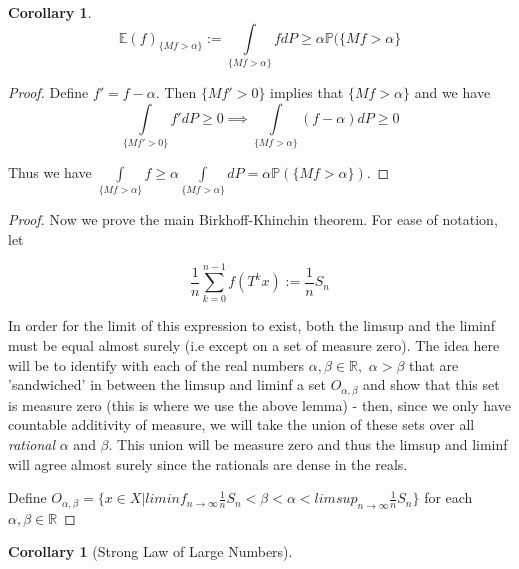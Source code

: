\documentclass[letterpaper,10pt,oneside,onecolumn,reqno]{amsart}
\newcommand{\E}{\mathbb E}
\renewcommand{\P}{\mathbb P}
\newcommand{\R}{\mathbb R}
\theoremstyle{definition}
\newtheorem{cor}[thm]{Corollary}
\begin{document}
\begin{cor}
$$\mbox{$\E(f)_{\{Mf>\alpha\}} := \int\limits_{\{Mf>\alpha\}} fdP \geq \alpha \P(\{Mf>\alpha\}$}$$
\end{cor}
\begin{proof}
Define $f' = f - \alpha$. Then $\{Mf' > 0\}$ implies that $\{Mf > \alpha\}$ and we have
$$\mbox{$\int\limits_{\{Mf'>0\}} f'dP \geq 0 \implies \int\limits_{\{Mf>\alpha\}} (f-\alpha)dP \geq 0$}$$

Thus we have $\int\limits_{\{Mf>\alpha\}} f \geq \alpha\int\limits_{\{Mf>\alpha\}}dP = \alpha\P(\{Mf>\alpha\})$.
\end{proof}




		\begin{proof}
Now we prove the main Birkhoff-Khinchin theorem. For ease of notation, let 

$$\mbox{$\frac{1}{n}\sum\limits_{k=0}^{n-1} f(T^kx) := \frac{1}{n}S_n$}$$

In order for the limit of this expression to exist, both the limsup and the liminf must be equal almost surely (i.e except on a set of measure zero). The idea here will be to identify with each of the real numbers $\alpha, \beta \in \R,$ $\alpha > \beta$ that are 'sandwiched' in between the limsup and liminf a set $O_{\alpha,\beta}$ and show that this set is measure zero (this is where we use the above lemma) - then, since we only have countable additivity of measure, we will take the union of these sets over all \emph{rational} $\alpha$ and $\beta$. This union will be measure zero and thus the limsup and liminf will agree almost surely since the rationals are dense in the reals.

Define $O_{\alpha,\beta} = \{x \in X | liminf_{n \to \infty}\frac{1}{n}S_n < \beta < \alpha < limsup_{n \to \infty}\frac{1}{n}S_n\}$ for each $\alpha, \beta \in \R$

		\end{proof}
		
		\begin{cor}[Strong Law of Large Numbers]
		
		\end{cor}


	
\end{document}
